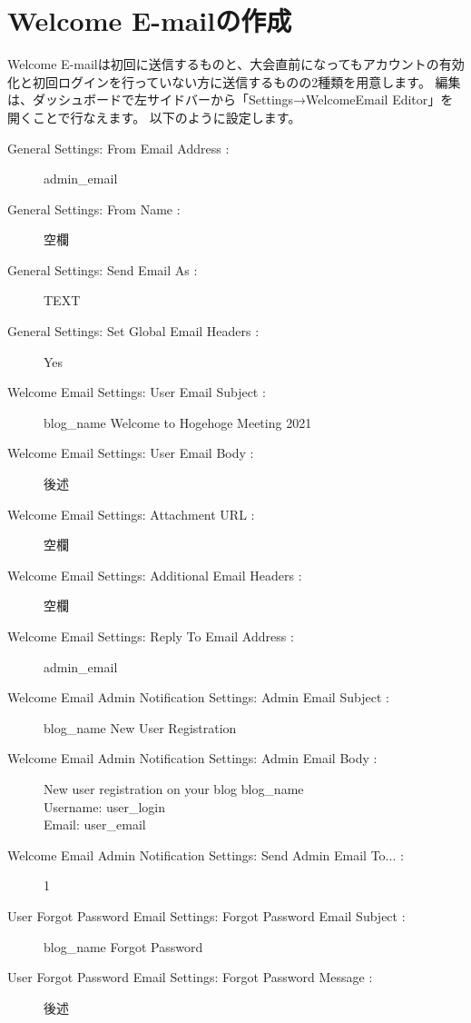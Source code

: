 \documentclass[titlepage,10pt,a4paper,uplatex]{jsbook}
\begin{document}
\section{Welcome E-mailの作成}

Welcome E-mailは初回に送信するものと、大会直前になってもアカウントの有効化と初回ログインを行っていない方に送信するものの2種類を用意します。
編集は、ダッシュボードで左サイドバーから「Settings→WelcomeEmail Editor」を開くことで行なえます。
以下のように設定します。

\begin{description}
\item[General Settings: From Email Address : ] {\lbrack}admin\_email{\rbrack}
\item[General Settings: From Name : ] 空欄
\item[General Settings: Send Email As : ] TEXT
\item[General Settings: Set Global Email Headers : ] Yes
\item[Welcome Email Settings: User Email Subject : ] {\lbrack}{\lbrack}blog\_name{\rbrack}{\rbrack} Welcome to Hogehoge Meeting 2021
\item[Welcome Email Settings: User Email Body : ] 後述
\item[Welcome Email Settings: Attachment URL : ] 空欄
\item[Welcome Email Settings: Additional Email Headers : ] 空欄
\item[Welcome Email Settings: Reply To Email Address : ] {\lbrack}admin\_email{\rbrack}
\item[Welcome Email Admin Notification Settings: Admin Email Subject : ] {\lbrack}{\lbrack}blog\_name{\rbrack}{\rbrack} New User Registration
\item[Welcome Email Admin Notification Settings: Admin Email Body : ] New user registration on your blog {\lbrack}blog\_name{\rbrack}\\
Username: {\lbrack}user\_login{\rbrack}\\
Email: {\lbrack}user\_email{\rbrack}
\item[Welcome Email Admin Notification Settings: Send Admin Email To... : ] 1
\item[User Forgot Password Email Settings: Forgot Password Email Subject : ] {\lbrack}{\lbrack}blog\_name{\rbrack}{\rbrack} Forgot Password
\item[User Forgot Password Email Settings: Forgot Password Message : ] 後述
\end{description}
\end{document}
